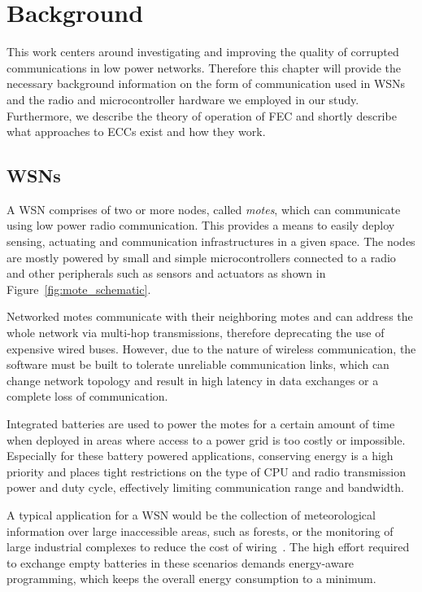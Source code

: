 \chapter{Background}
\label{chap:background}

This work centers around investigating and improving the quality of corrupted communications in low power networks.
Therefore this chapter will provide the necessary background information on the form of communication used in \acl{WSN}s and the radio and microcontroller hardware we employed in our study.
Furthermore, we describe the theory of operation of \acl{FEC} and shortly describe what approaches to \acl{ECC}s exist and how they work.

\section{\acl{WSN}s}

A \acf{WSN} comprises of two or more nodes, called \emph{motes}, which can communicate using low power radio communication.
This provides a means to easily deploy sensing, actuating and communication infrastructures in a given space.
The nodes are mostly powered by small and simple microcontrollers connected to a radio and other peripherals such as sensors and actuators as shown in Figure~\ref{fig:mote_schematic}.

Networked motes communicate with their neighboring motes and can address the whole network via multi-hop transmissions, therefore deprecating the use of expensive wired buses.
However, due to the nature of wireless communication, the software must be built to tolerate unreliable communication links, which can change network topology and result in high latency in data exchanges or a complete loss of communication.

Integrated batteries are used to power the motes for a certain amount of time when deployed in areas where access to a power grid is too costly or impossible.
Especially for these battery powered applications, conserving energy is a high priority and places tight restrictions on the type of CPU and radio transmission power and duty cycle, effectively limiting communication range and bandwidth.

A typical application for a \ac{WSN} would be the collection of meteorological information over large inaccessible areas, such as forests, or the monitoring of large industrial complexes to reduce the cost of wiring~\cite{Boano2009}.
The high effort required to exchange empty batteries in these scenarios demands energy-aware programming, which keeps the overall energy consumption to a minimum.


